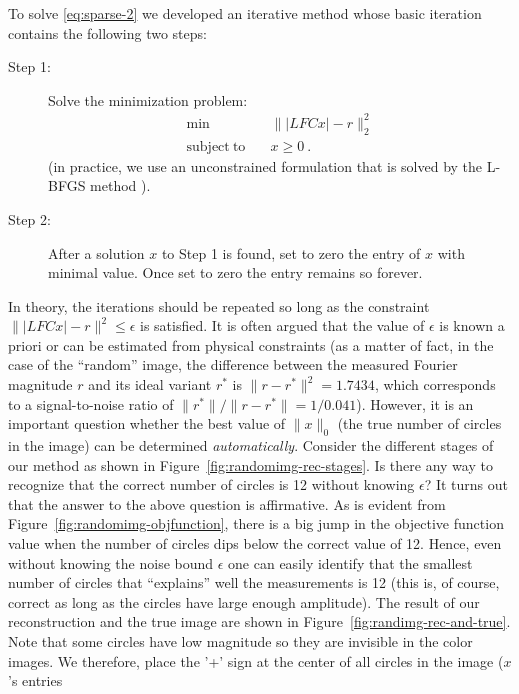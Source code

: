 To solve \eqref{eq:sparse-2} we developed an iterative method whose basic
iteration contains the following two steps:
\begin{description}
\item[Step 1:] Solve the minimization problem:
  \begin{equation}
    \label{eq:sparse-3}
    \begin{split}
      \min &\quad \||LFCx| - r\|_{2}^{2}\\
      \mathrm{subject\ to} &\quad x \geq 0 \ .
    \end{split}
  \end{equation}
  (in practice, we use an unconstrained formulation that is solved by
  the L-BFGS method ).
\item[Step 2:]
  After a solution $x$ to Step 1 is found, set to zero the entry of
  $x$ with minimal value. Once set to zero the entry remains so
  forever.
\end{description}
In theory, the iterations should be repeated so long as the constraint
$\||LFCx| - r\|^{2}\leq\epsilon$ is satisfied. It is often argued that
the value of $\epsilon$ is known a priori or can be estimated from
physical constraints (as a matter of fact, in the case of the
``random'' image, the difference between the measured Fourier
magnitude $r$ and its ideal variant $r^{*}$ is $\|r - r^{*}\|^{2} =
1.7434$, which corresponds to a signal-to-noise ratio of $\|r^{*}\|/\|r
- r^{*}\| = 1/0.041$). However, it is an important question whether the
best value of $\|x\|_{0}$ (the true number of circles in the image)
can be determined \emph{automatically}. Consider the different stages
of our method as shown in Figure~\ref{fig:randomimg-rec-stages}. Is
there any way to recognize that the correct number of circles is 12
without knowing $\epsilon$?  It turns out that the answer to the above
question is affirmative. As is evident from
Figure~\ref{fig:randomimg-objfunction}, there is a big jump in the
objective function value when the number of circles dips below the
correct value of 12. Hence, even without knowing the noise bound
$\epsilon$ one can easily identify that the smallest number of circles
that ``explains'' well the measurements is 12 (this is, of
course, correct as long as the circles have large enough amplitude).
The result of our
reconstruction and the true image are shown in
Figure~\ref{fig:randimg-rec-and-true}.  Note that some circles have low
magnitude so they are invisible in the color images. We therefore, place
the '+' sign at the center of all circles in the image ($x$'s entries
